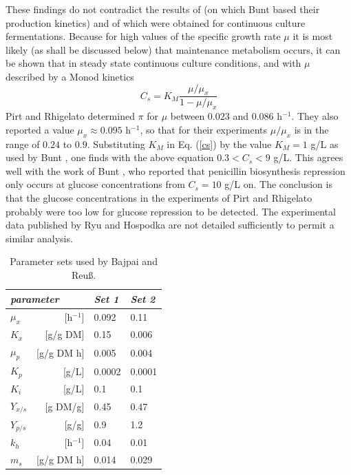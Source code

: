 \documentclass{river-journal}
\begin{document}
These findings do not contradict the results of
\cite{Chin88-book} (on which Bunt \cite{Bunt} based their
production kinetics) and of \cite{ChinThesis} which were
obtained for continuous culture fermentations.  Because for high
values of the specific growth rate $\mu$ it is most likely (as shall
be discussed below) that maintenance metabolism occurs, it can be
shown that in steady state continuous culture conditions, and with
$\mu$ described by a Monod kinetics
\begin{equation}
    C_{s}  =  K_{M} \frac{\mu/\mu_{x}}{1-\mu/\mu_{x}} \label{cs}
\end{equation}
Pirt and Rhigelato determined $\pi$ for $\mu$ between
$0.023$ and $0.086$ h$^{-1}$.
They also reported a value $\mu_{x} \approx 0.095$
h$^{-1}$, so that for their experiments $\mu/\mu_{x}$ is in the range
of $0.24$ to $0.9$.
Substituting $K _M$ in Eq. (\ref{cs}) by
the value $K_{M}=1$ g/L as used by Bunt \cite{Bunt}, one finds
with the above equation $0.3 < C_{s} < 9$ g/L. This agrees well with
the work of Bunt \cite{Bunt}, who reported that penicillin biosynthesis
repression only occurs at glucose concentrations from $C_{s}=10$ g/L on.
The conclusion is that the glucose concentrations in the experiments of
Pirt and Rhigelato probably were too low for glucose repression to be
detected. The experimental data published by Ryu and Hospodka
are not detailed sufficiently to permit a similar analysis.



\begin{table}
\caption[]{Parameter sets used by Bajpai and Reu{\ss}.}
\begin{tabular}{lrll}
\hline
\multicolumn{2}{l}{\it parameter} & {\it Set 1} & {\it Set 2}\\
\hline
$\mu_{x}$           & [h$^{-1}$]  & 0.092       & 0.11          \\
$K_{x}$             & [g/g DM]     & 0.15        & 0.006         \\
$\mu_{p}$           & [g/g DM h]  & 0.005       & 0.004         \\
$K_{p}$             & [g/L]        & 0.0002      & 0.0001        \\
$K_{i}$             & [g/L]        & 0.1         & 0.1           \\
$Y_{x/s}$           & [g DM/g]     & 0.45        & 0.47          \\
$Y_{p/s}$           & [g/g]        & 0.9         & 1.2           \\
$k_{h}$             & [h$^{-1}$]  & 0.04        & 0.01          \\
$m_{s}$             & [g/g DM h]  & 0.014       & 0.029         \\
\hline
\end{tabular}
\end{table}
\end{document}
